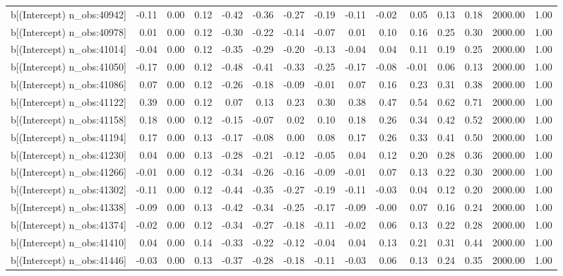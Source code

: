 \begin{table}[ht]
\begin{tabular}{rrrrrrrrrrrrrrr}
  b[(Intercept) n\_obs:40942] & -0.11 & 0.00 & 0.12 & -0.42 & -0.36 & -0.27 & -0.19 & -0.11 & -0.02 & 0.05 & 0.13 & 0.18 & 2000.00 & 1.00 \\ 
  b[(Intercept) n\_obs:40978] & 0.01 & 0.00 & 0.12 & -0.30 & -0.22 & -0.14 & -0.07 & 0.01 & 0.10 & 0.16 & 0.25 & 0.30 & 2000.00 & 1.00 \\ 
  b[(Intercept) n\_obs:41014] & -0.04 & 0.00 & 0.12 & -0.35 & -0.29 & -0.20 & -0.13 & -0.04 & 0.04 & 0.11 & 0.19 & 0.25 & 2000.00 & 1.00 \\ 
  b[(Intercept) n\_obs:41050] & -0.17 & 0.00 & 0.12 & -0.48 & -0.41 & -0.33 & -0.25 & -0.17 & -0.08 & -0.01 & 0.06 & 0.13 & 2000.00 & 1.00 \\ 
  b[(Intercept) n\_obs:41086] & 0.07 & 0.00 & 0.12 & -0.26 & -0.18 & -0.09 & -0.01 & 0.07 & 0.16 & 0.23 & 0.31 & 0.38 & 2000.00 & 1.00 \\ 
  b[(Intercept) n\_obs:41122] & 0.39 & 0.00 & 0.12 & 0.07 & 0.13 & 0.23 & 0.30 & 0.38 & 0.47 & 0.54 & 0.62 & 0.71 & 2000.00 & 1.00 \\ 
  b[(Intercept) n\_obs:41158] & 0.18 & 0.00 & 0.12 & -0.15 & -0.07 & 0.02 & 0.10 & 0.18 & 0.26 & 0.34 & 0.42 & 0.52 & 2000.00 & 1.00 \\ 
  b[(Intercept) n\_obs:41194] & 0.17 & 0.00 & 0.13 & -0.17 & -0.08 & 0.00 & 0.08 & 0.17 & 0.26 & 0.33 & 0.41 & 0.50 & 2000.00 & 1.00 \\ 
  b[(Intercept) n\_obs:41230] & 0.04 & 0.00 & 0.13 & -0.28 & -0.21 & -0.12 & -0.05 & 0.04 & 0.12 & 0.20 & 0.28 & 0.36 & 2000.00 & 1.00 \\ 
  b[(Intercept) n\_obs:41266] & -0.01 & 0.00 & 0.12 & -0.34 & -0.26 & -0.16 & -0.09 & -0.01 & 0.07 & 0.13 & 0.22 & 0.30 & 2000.00 & 1.00 \\ 
  b[(Intercept) n\_obs:41302] & -0.11 & 0.00 & 0.12 & -0.44 & -0.35 & -0.27 & -0.19 & -0.11 & -0.03 & 0.04 & 0.12 & 0.20 & 2000.00 & 1.00 \\ 
  b[(Intercept) n\_obs:41338] & -0.09 & 0.00 & 0.13 & -0.42 & -0.34 & -0.25 & -0.17 & -0.09 & -0.00 & 0.07 & 0.16 & 0.24 & 2000.00 & 1.00 \\ 
  b[(Intercept) n\_obs:41374] & -0.02 & 0.00 & 0.12 & -0.34 & -0.27 & -0.18 & -0.11 & -0.02 & 0.06 & 0.13 & 0.22 & 0.28 & 2000.00 & 1.00 \\ 
  b[(Intercept) n\_obs:41410] & 0.04 & 0.00 & 0.14 & -0.33 & -0.22 & -0.12 & -0.04 & 0.04 & 0.13 & 0.21 & 0.31 & 0.44 & 2000.00 & 1.00 \\ 
  b[(Intercept) n\_obs:41446] & -0.03 & 0.00 & 0.13 & -0.37 & -0.28 & -0.18 & -0.11 & -0.03 & 0.06 & 0.13 & 0.24 & 0.35 & 2000.00 & 1.00 \\ 

\end{tabular}
\end{table}
